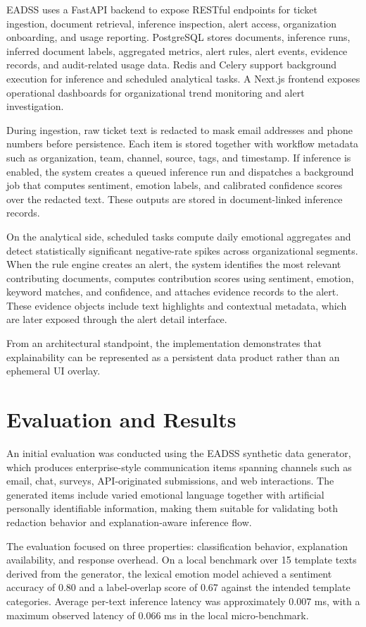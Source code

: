 \documentclass[conference]{IEEEtran}
\begin{document}
EADSS uses a FastAPI backend to expose RESTful endpoints for ticket ingestion, document retrieval, inference inspection, alert access, organization onboarding, and usage reporting. PostgreSQL stores documents, inference runs, inferred document labels, aggregated metrics, alert rules, alert events, evidence records, and audit-related usage data. Redis and Celery support background execution for inference and scheduled analytical tasks. A Next.js frontend exposes operational dashboards for organizational trend monitoring and alert investigation.

During ingestion, raw ticket text is redacted to mask email addresses and phone numbers before persistence. Each item is stored together with workflow metadata such as organization, team, channel, source, tags, and timestamp. If inference is enabled, the system creates a queued inference run and dispatches a background job that computes sentiment, emotion labels, and calibrated confidence scores over the redacted text. These outputs are stored in document-linked inference records.

On the analytical side, scheduled tasks compute daily emotional aggregates and detect statistically significant negative-rate spikes across organizational segments. When the rule engine creates an alert, the system identifies the most relevant contributing documents, computes contribution scores using sentiment, emotion, keyword matches, and confidence, and attaches evidence records to the alert. These evidence objects include text highlights and contextual metadata, which are later exposed through the alert detail interface.

From an architectural standpoint, the implementation demonstrates that explainability can be represented as a persistent data product rather than an ephemeral UI overlay.

\section{Evaluation and Results}
An initial evaluation was conducted using the EADSS synthetic data generator, which produces enterprise-style communication items spanning channels such as email, chat, surveys, API-originated submissions, and web interactions. The generated items include varied emotional language together with artificial personally identifiable information, making them suitable for validating both redaction behavior and explanation-aware inference flow.

The evaluation focused on three properties: classification behavior, explanation availability, and response overhead. On a local benchmark over 15 template texts derived from the generator, the lexical emotion model achieved a sentiment accuracy of 0.80 and a label-overlap score of 0.67 against the intended template categories. Average per-text inference latency was approximately 0.007 ms, with a maximum observed latency of 0.066 ms in the local micro-benchmark.
\end{document}
